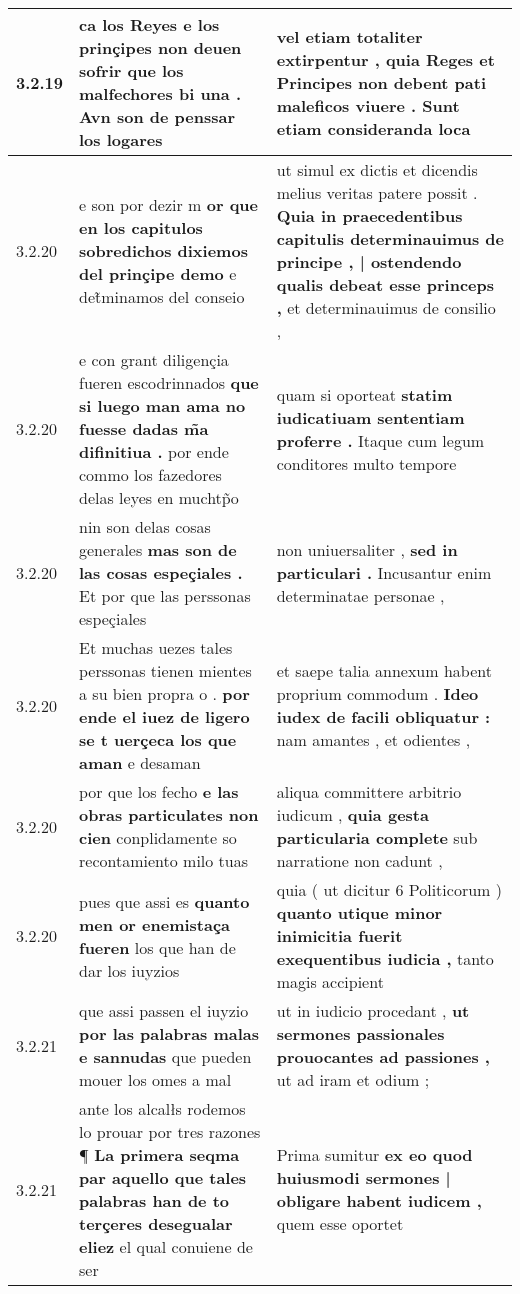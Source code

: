 \begin{tabular}{|p{1cm}|p{6.5cm}|p{6.5cm}|}
3.2.19 & ca los Reyes e los prinçipes non deuen sofrir \textbf{ que los malfechores bi una . } Avn son de penssar los logares & vel etiam totaliter extirpentur , \textbf{ quia Reges et Principes non debent pati maleficos viuere . } Sunt etiam consideranda loca \\\hline
3.2.20 & e son por dezir m \textbf{ or que en los capitulos sobredichos dixiemos del prinçipe demo } e det̃minamos del conseio & ut simul ex dictis et dicendis melius veritas patere possit . \textbf{ Quia in praecedentibus capitulis determinauimus de principe , | ostendendo qualis debeat esse princeps , } et determinauimus de consilio , \\\hline
3.2.20 & e con grant diligençia fueren escodrinnados \textbf{ que si luego man ama no fuesse dadas m̃a difinitiua . } por ende commo los fazedores delas leyes en muchtp̃o & quam si oporteat \textbf{ statim iudicatiuam sententiam proferre . } Itaque cum legum conditores multo tempore \\\hline
3.2.20 & nin son delas cosas generales \textbf{ mas son de las cosas espeçiales . } Et por que las perssonas espeçiales & non uniuersaliter , \textbf{ sed in particulari . } Incusantur enim determinatae personae , \\\hline
3.2.20 & Et muchas uezes tales perssonas tienen mientes a su bien propra o . \textbf{ por ende el iuez de ligero se t uerçeca los que aman } e desaman & et saepe talia annexum habent proprium commodum . \textbf{ Ideo iudex de facili obliquatur : } nam amantes , et odientes , \\\hline
3.2.20 & por que los fecho \textbf{ e las obras particulates non cien } conplidamente so recontamiento milo tuas & aliqua committere arbitrio iudicum , \textbf{ quia gesta particularia complete } sub narratione non cadunt , \\\hline
3.2.20 & pues que assi es \textbf{ quanto men or enemistaça fueren } los que han de dar los iuyzios & quia ( ut dicitur 6 Politicorum ) \textbf{ quanto utique minor inimicitia fuerit exequentibus iudicia , } tanto magis accipient \\\hline
3.2.21 & que assi passen el iuyzio \textbf{ por las palabras malas e sannudas } que pueden mouer los omes a mal & ut in iudicio procedant , \textbf{ ut sermones passionales prouocantes ad passiones , } ut ad iram et odium ; \\\hline
3.2.21 & ante los alcalłs rodemos lo prouar por tres razones ¶ \textbf{ La primera seqma par aquello que tales palabras han de to terçeres desegualar eliez } el qual conuiene de ser & Prima sumitur \textbf{ ex eo quod huiusmodi sermones | obligare habent iudicem , } quem esse oportet \\\hline

\end{tabular}
